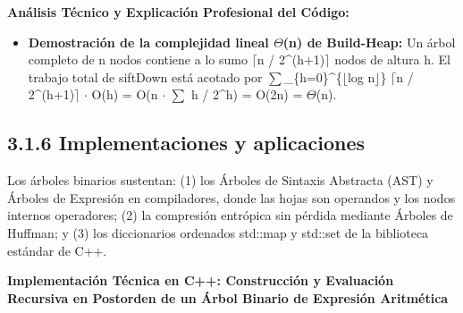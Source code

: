 \documentclass[11pt,letterpaper]{article}
\begin{document}
\noindent\textbf{\color{ipnguinda}Análisis Técnico y Explicación Profesional del Código:}\par\vspace{-2pt}
\begin{itemize}
\setlength{\itemsep}{2pt}\setlength{\parskip}{0pt}
  \item \textbf{Demostración de la complejidad lineal $\Theta$(n) de Build-Heap: }Un árbol completo de n nodos contiene a lo sumo $\lceil$n / 2\textasciicircum{}(h+1)$\rceil$ nodos de altura h. El trabajo total de siftDown está acotado por $\sum$\_\{h=0\}\textasciicircum{}\{$\lfloor$log n$\rfloor$\} $\lceil$n / 2\textasciicircum{}(h+1)$\rceil$ $\cdot$ O(h) = O(n $\cdot$ $\sum$ h / 2\textasciicircum{}h) = O(2n) = $\Theta$(n).
\end{itemize}
\subsection*{3.1.6 Implementaciones y aplicaciones}
Los árboles binarios sustentan: (1) los Árboles de Sintaxis Abstracta (AST) y Árboles de Expresión en compiladores, donde las hojas son operandos y los nodos internos operadores; (2) la compresión entrópica sin pérdida mediante Árboles de Huffman; y (3) los diccionarios ordenados std::map y std::set de la biblioteca estándar de C++.\par
\vspace{4pt}\noindent\textbf{\color{ipnblue}Implementación Técnica en C++: Construcción y Evaluación Recursiva en Postorden de un Árbol Binario de Expresión Aritmética}\par\vspace{-2pt}
\end{document}
